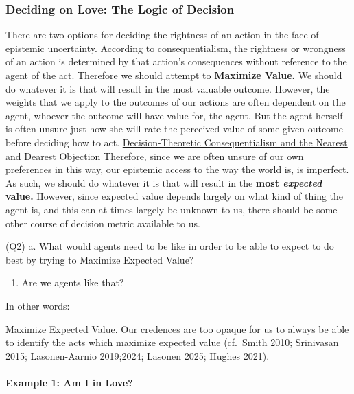 \documentclass[
  letterpaper,
  DIV=11,
  numbers=noendperiod]{scrartcl}
\makeatletter
\let\oldparagraph\paragraph
\renewcommand{\paragraph}{
    \@ifstar
      \xxxParagraphStar
      \xxxParagraphNoStar
  }
\newcommand{\xxxParagraphStar}[1]{\oldparagraph*{#1}\mbox{}}
\newcommand{\xxxParagraphNoStar}[1]{\oldparagraph{#1}\mbox{}}
\providecommand{\tightlist}{%
  \setlength{\itemsep}{0pt}\setlength{\parskip}{0pt}}
\makeatother
\begin{document}
\subsubsection{\texorpdfstring{\textbf{Deciding on Love: The Logic of
Decision}}{Deciding on Love: The Logic of Decision}}\label{deciding-on-love-the-logic-of-decision}

There are two options for deciding the rightness of an action in the
face of epistemic uncertainty. According to consequentialism, the
rightness or wrongness of an action is determined by that action's
consequences without reference to the agent of the act. Therefore we
should attempt to \textbf{Maximize Value.} We should do whatever it is
that will result in the most valuable outcome. However, the weights that
we apply to the outcomes of our actions are often dependent on the
agent, whoever the outcome will have value for, the agent. But the agent
herself is often unsure just how she will rate the perceived value of
some given outcome before deciding how to act.
\href{https://app.notion.com/p/Decision-Theoretic-Consequentialism-and-the-Nearest-and-Dearest-Objection-3748935bcf8a81a29380f327e8971b1d?pvs=21}{Decision-Theoretic
Consequentialism and the Nearest and Dearest Objection} Therefore, since
we are often unsure of our own preferences in this way, our epistemic
access to the way the world is, is imperfect. As such, we should do
whatever it is that will result in the \textbf{most \emph{expected}
value.} However, since expected value depends largely on what kind of
thing the agent is, and this can at times largely be unknown to us,
there should be some other course of decision metric available to us.

(Q2) a. What would agents need to be like in order to be able to expect
to do best by trying to Maximize Expected Value?

\begin{enumerate}
\def\labelenumi{\alph{enumi}.}
\setcounter{enumi}{1}
\tightlist
\item
  Are we agents like that?
\end{enumerate}

In other words:

Maximize Expected Value. Our credences are too opaque for us to always
be able to identify the acts which maximize expected value (cf.~Smith
2010; Srinivasan 2015; Lasonen-Aarnio 2019;2024; Lasonen 2025; Hughes
2021).

\paragraph{\texorpdfstring{\textbf{Example 1: Am I in
Love?}}{Example 1: Am I in Love?}}\label{example-1-am-i-in-love}
\end{document}
